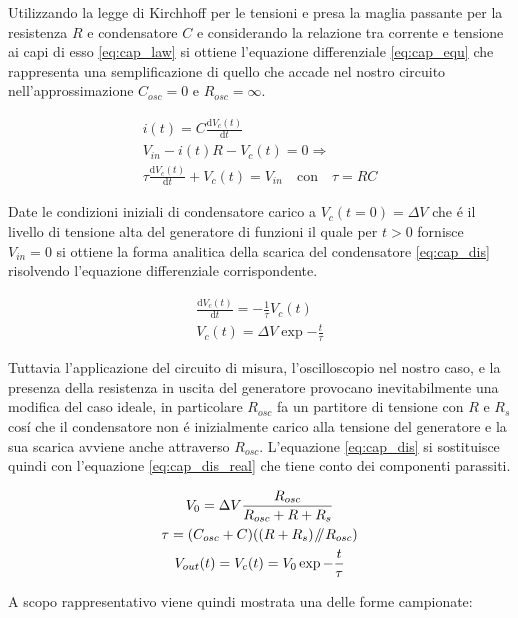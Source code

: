 \documentclass{article}
\newcommand{\de}{\mathrm{d}}
\newcommand{\pars}{\mathbin{\!/\mkern-5mu/\!}}
\begin{document}
Utilizzando la legge di Kirchhoff per le tensioni e presa la maglia passante per la resistenza $R$ e condensatore $C$ e considerando la relazione tra corrente e tensione ai capi di esso \ref{eq:cap_law} si ottiene l'equazione differenziale \ref{eq:cap_equ} che rappresenta una semplificazione di quello che accade nel nostro circuito nell'approssimazione $C_{osc}=0$ e $R_{osc} = \infty $.

\begin{gather}
    i(t) = C \frac{\de V_c (t)}{\de t}
    \label{eq:cap_law} \\   
    \nonumber V_{in} - i(t) R - V_c(t) = 0 \Rightarrow \\
    \tau \frac{\de V_c(t)}{\de t} + V_c(t) = V_{in} \quad \textrm{con} \quad \tau = RC
    \label{eq:cap_equ}
\end{gather}

Date le condizioni iniziali di condensatore carico a $V_c(t = 0) = \Delta V$ che \'e il livello di tensione alta del generatore di funzioni il quale per $t > 0$ fornisce $V_{in} = 0$ si ottiene la forma analitica della scarica del condensatore \ref{eq:cap_dis} risolvendo l'equazione differenziale corrispondente.

\begin{gather}
	\nonumber 
	\frac{\de V_c(t)}{\de t} = - \frac{1}{\tau} V_c(t) \\
	V_c(t) = \Delta V \exp{- \frac{t}{\tau}}
	\label{eq:cap_dis}
\end{gather}

Tuttavia l'applicazione del circuito di misura, l'oscilloscopio nel nostro caso, e la presenza della resistenza in uscita del generatore provocano inevitabilmente una modifica del caso ideale, in particolare $R_{osc}$ fa un partitore di tensione con $R$ e $R_{s}$ cos\'i che il condensatore non \'e inizialmente carico alla tensione del generatore e la sua scarica avviene anche attraverso $R_{osc}$.
L'equazione \ref{eq:cap_dis} si sostituisce quindi con l'equazione \ref{eq:cap_dis_real} che tiene conto dei componenti parassiti.

\begin{gather}
	\nonumber 
	V_0 = \Delta V \frac{R_{osc}}{R_{osc} + R + R_{s}} \\ 
	\tau = ( C_{osc} + C ) ( (R + R_s) \pars R_{osc} ) \\
	V_{out}(t) = V_c(t) = V_0 \exp{ -\frac{t}{\tau} }
	\label{eq:cap_dis_real}
\end{gather}

A scopo rappresentativo viene quindi mostrata una delle forme campionate:
\end{document}

